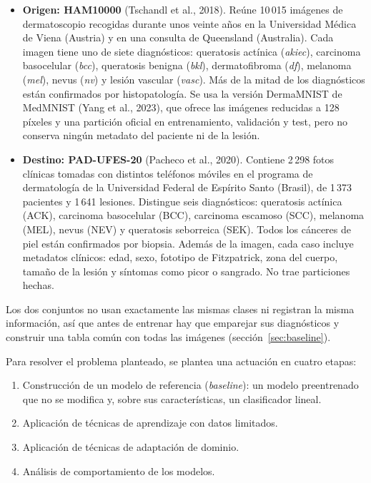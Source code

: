 \documentclass[10pt,a4paper]{article}
\renewcommand{\_}{\guionbajo\allowbreak}
\begin{document}
\begin{itemize}
    \item \textbf{Origen: HAM10000} (Tschandl et al., 2018). Reúne 10\,015 imágenes de dermatoscopio recogidas durante unos
    veinte años en la Universidad Médica de Viena (Austria) y en una consulta de Queensland (Australia). Cada imagen tiene uno
    de siete diagnósticos: queratosis actínica (\textit{akiec}), carcinoma basocelular (\textit{bcc}), queratosis benigna
    (\textit{bkl}), dermatofibroma (\textit{df}), melanoma (\textit{mel}), nevus (\textit{nv}) y lesión vascular
    (\textit{vasc}). Más de la mitad de los diagnósticos están confirmados por histopatología. Se usa la versión DermaMNIST
    de MedMNIST (Yang et al., 2023), que ofrece las imágenes reducidas a 128 píxeles y una partición oficial en
    entrenamiento, validación y test, pero no conserva ningún metadato del paciente ni de la lesión.
    \item \textbf{Destino: PAD-UFES-20} (Pacheco et al., 2020). Contiene 2\,298 fotos clínicas tomadas con distintos
    teléfonos móviles en el programa de dermatología de la Universidad Federal de Espírito Santo (Brasil), de 1\,373 pacientes
    y 1\,641 lesiones. Distingue seis diagnósticos: queratosis actínica (ACK), carcinoma basocelular (BCC), carcinoma
    escamoso (SCC), melanoma (MEL), nevus (NEV) y queratosis seborreica (SEK). Todos los cánceres de piel están confirmados
    por biopsia. Además de la imagen, cada caso incluye metadatos clínicos: edad, sexo, fototipo de Fitzpatrick, zona del
    cuerpo, tamaño de la lesión y síntomas como picor o sangrado. No trae particiones hechas.
\end{itemize}

\noindent Los dos conjuntos no usan exactamente las mismas clases ni registran la misma información, así que antes de
entrenar hay que emparejar sus diagnósticos y construir una tabla común con todas las imágenes (sección~\ref{sec:baseline}).

\medskip

\noindent Para resolver el problema planteado, se plantea una actuación en cuatro etapas:

\begin{enumerate}
    \item Construcción de un modelo de referencia (\textit{baseline}): un modelo
    preentrenado que no se modifica y, sobre sus características, un clasificador lineal.
    \item Aplicación de técnicas de aprendizaje con datos limitados. 
    \item Aplicación de técnicas de adaptación de dominio. 
    \item Análisis de comportamiento de los modelos.
\end{enumerate}
\end{document}
